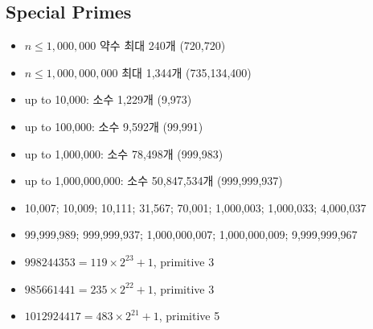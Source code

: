 \subsection{Special Primes}
\begin{itemize}
\item $n \leq 1,000,000$ 약수 최대 240개 (720,720)
\item $n \leq 1,000,000,000$ 최대 1,344개 (735,134,400)
\item up to 10,000: 소수 1,229개 (9,973)
\item up to 100,000: 소수 9,592개 (99,991)
\item up to 1,000,000: 소수 78,498개 (999,983)
\item up to 1,000,000,000: 소수 50,847,534개 (999,999,937)
\item 10,007; 10,009; 10,111; 31,567; 70,001; 1,000,003; 1,000,033; 4,000,037
\item 99,999,989; 999,999,937; 1,000,000,007; 1,000,000,009; 9,999,999,967
\item $998244353 = 119 \times 2^{23} + 1$, primitive 3
\item $985661441 = 235 \times 2^{22} + 1$, primitive 3
\item $1012924417 = 483 \times 2^{21} + 1$, primitive 5
\end{itemize}